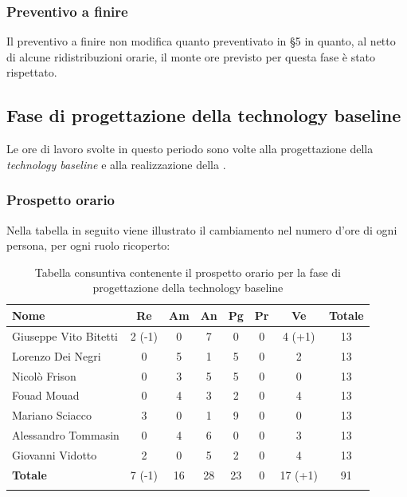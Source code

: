 		\subsubsection{Preventivo a finire}
			Il preventivo a finire non modifica quanto preventivato in \S5 in quanto, al netto di alcune ridistribuzioni orarie, il monte ore previsto per questa fase è stato rispettato.
		\pagebreak

		\subsection{Fase di progettazione della technology baseline}
		Le ore di lavoro svolte in questo periodo sono volte alla progettazione della \textit{technology baseline} e alla realizzazione della . 

		\subsubsection{Prospetto orario}
			Nella tabella in seguito viene illustrato il cambiamento nel numero d'ore di ogni persona, per ogni ruolo ricoperto:
			
			\begin{longtable}{|l|c|c|c|c|c|c|c|}
				\hline
				\rowcolor{lighter-grayer}
				\textbf{Nome} & \textbf{Re} & \textbf{Am} & \textbf{An} & \textbf{Pg}  & \textbf{Pr}   & \textbf{Ve} & \textbf{Totale} \\
				\hline
				\endfirsthead
				\hline
				Giuseppe Vito Bitetti & 2 (-1) & 0 & 7 & 0 & 0 & 4 (+1) & 13\\
				\hline
				\hline
				Lorenzo Dei Negri & 0 & 5 & 1 & 5 & 0 & 2 & 13\\
				\hline
				\hline
				Nicolò Frison & 0 & 3 & 5 & 5 & 0 & 0 & 13\\
				\hline
				\hline
				Fouad Mouad & 0 & 4 & 3 & 2 & 0 & 4 & 13 \\
				\hline
				\hline
				Mariano Sciacco & 3 & 0 & 1 & 9 & 0 & 0 & 13\\
				\hline
				\hline
				Alessandro Tommasin & 0 & 4 & 6 & 0 & 0 & 3  & 13\\
				\hline
				\hline
				Giovanni Vidotto & 2 & 0 & 5 & 2 & 0 & 4 & 13\\
				\hline 
				\textbf{Totale} & 7 (-1) &  16 & 28 & 23 & 0 & 17 (+1) & 91 \\
				\hline
				
				\caption{Tabella consuntiva contenente il prospetto orario per la fase di progettazione della technology baseline}
			\end{longtable}
			
